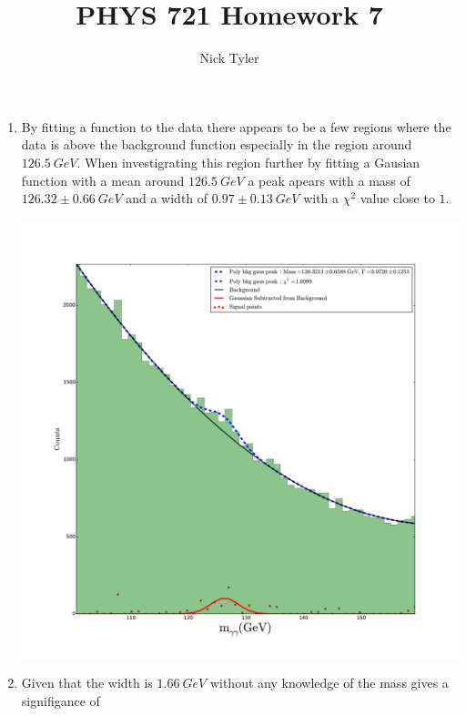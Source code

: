 \documentclass[pdftex]{article}
\title{PHYS 721 Homework 7}
\author{Nick Tyler}
\date{}
\begin{document}
\captionsetup[figure]{aboveskip=-15pt}
\captionsetup[figure]{belowskip=15pt}
\maketitle
\begin{enumerate}
	\item  By fitting a function to the data there appears to be a few regions where the data
			is above the background function especially in the region around $126.5 \: GeV.$
			When investigrating this region further by fitting a Gausian function with a mean
			around $126.5 \: GeV$ a peak apears with a mass of $126.32 \pm 0.66 \: GeV$ and a
			width of $0.97 \pm 0.13 \: GeV$ with a $\chi^{2}$ value close to $1.$\

		\includegraphics[scale=0.35]{Problem_1.pdf}\\

	\item Given that the width is $1.66 \: GeV$ without any knowledge of the mass gives
			a signifigance of 


\end{enumerate}
\end{document}
